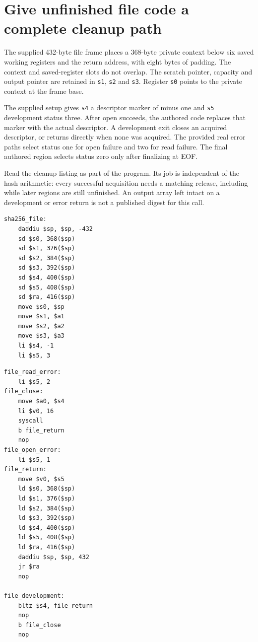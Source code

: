 \section{Give unfinished file code a complete cleanup path}
The supplied 432-byte file frame places a 368-byte private context below six saved
working registers and the return address, with eight bytes of padding. The context
and saved-register slots do not overlap. The scratch pointer, capacity and output
pointer are retained in \texttt{s1}, \texttt{s2} and \texttt{s3}. Register
\texttt{s0} points to the private context at the frame base.

The supplied setup gives \texttt{s4} a descriptor marker of minus one and
\texttt{s5} development status three. After open succeeds, the authored code replaces
that marker with the actual descriptor. A development exit closes an acquired
descriptor, or returns directly when none was acquired. The provided real error paths
select status one for open failure and two for read failure. The final authored region
selects status zero only after finalizing at EOF.

Read the cleanup listing as part of the program. Its job is independent of the hash
arithmetic: every successful acquisition needs a matching release, including while
later regions are still unfinished. An output array left intact on a development or
error return is not a published digest for this call.

\begin{verbatim}
sha256_file:
    daddiu $sp, $sp, -432
    sd $s0, 368($sp)
    sd $s1, 376($sp)
    sd $s2, 384($sp)
    sd $s3, 392($sp)
    sd $s4, 400($sp)
    sd $s5, 408($sp)
    sd $ra, 416($sp)
    move $s0, $sp
    move $s1, $a1
    move $s2, $a2
    move $s3, $a3
    li $s4, -1
    li $s5, 3
\end{verbatim}

\begin{verbatim}
file_read_error:
    li $s5, 2
file_close:
    move $a0, $s4
    li $v0, 16
    syscall
    b file_return
    nop
file_open_error:
    li $s5, 1
file_return:
    move $v0, $s5
    ld $s0, 368($sp)
    ld $s1, 376($sp)
    ld $s2, 384($sp)
    ld $s3, 392($sp)
    ld $s4, 400($sp)
    ld $s5, 408($sp)
    ld $ra, 416($sp)
    daddiu $sp, $sp, 432
    jr $ra
    nop

file_development:
    bltz $s4, file_return
    nop
    b file_close
    nop
\end{verbatim}
